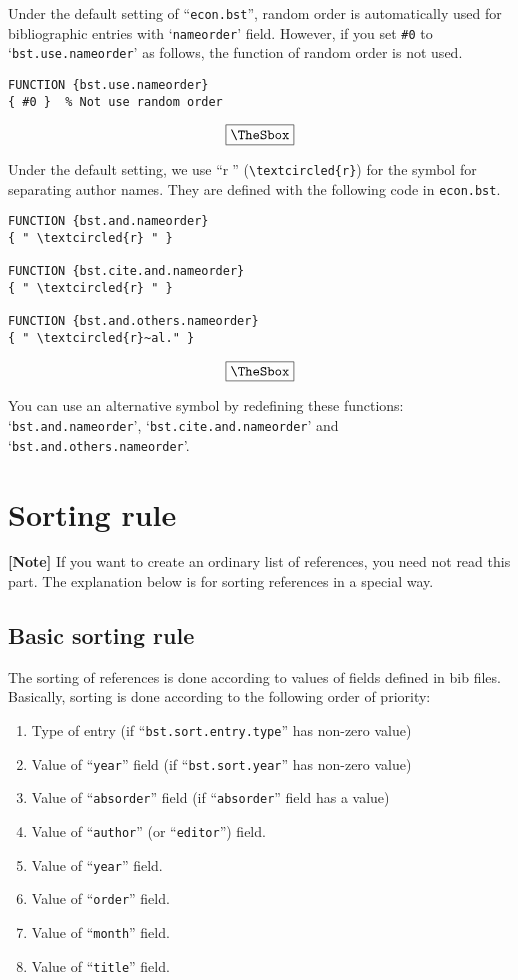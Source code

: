 \documentclass[10pt]{article}
\newenvironment{Frame}%
{\setlength{\fboxsep}{15pt}
\setlength{\mylength}{\linewidth}%
\addtolength{\mylength}{-2\fboxsep}%
\addtolength{\mylength}{-2\fboxrule}%
\Sbox
\minipage{\mylength}%
\setlength{\abovedisplayskip}{0pt}%
\setlength{\belowdisplayskip}{0pt}%
}%
{\endminipage\endSbox
\[\fbox{\TheSbox}\]}
\begin{document}
Under the default setting of ``\texttt{econ.bst}'', random order is
automatically used for bibliographic entries with `\texttt{nameorder}' field.
However, if you set \verb|#0| to `\texttt{bst.use.nameorder}' as follows, the
function of random order is not used.
\begin{Frame}
\begin{verbatim}
FUNCTION {bst.use.nameorder}
{ #0 }  % Not use random order
\end{verbatim}
\end{Frame}

Under the default setting, we use ``\textcircled{r}'' (\verb|\textcircled{r}|)
for the symbol for separating author names.
They are defined with the following code in \texttt{econ.bst}.
\begin{Frame}
\begin{verbatim}
FUNCTION {bst.and.nameorder}
{ " \textcircled{r} " }

FUNCTION {bst.cite.and.nameorder}
{ " \textcircled{r} " }

FUNCTION {bst.and.others.nameorder}
{ " \textcircled{r}~al." }
\end{verbatim}
\end{Frame}

You can use an alternative symbol by redefining these functions:
`\texttt{bst.and.nameorder}', `\texttt{bst.cite.and.nameorder}' and
`\texttt{bst.and.others.nameorder}'.


\section{Sorting rule}
\label{sec:sort_rule}

\noindent \textbf{[Note]} If you want to create an ordinary list of
references, you need not  read this part.  The explanation below is
for sorting references in a special way.

\subsection{Basic sorting rule}

The sorting of references is done according to values of fields defined
in bib files.  Basically, sorting is done according to the following
order of priority:
\begin{enumerate}
 \item Type of entry (if ``\texttt{bst.sort.entry.type}'' has non-zero value)
 \item Value of ``\texttt{year}'' field (if ``\texttt{bst.sort.year}'' has non-zero value)
 \item Value of ``\texttt{absorder}'' field (if ``\texttt{absorder}'' field has
       a value)
 \item Value of ``\texttt{author}'' (or ``\texttt{editor}'') field.
 \item Value of ``\texttt{year}'' field.
 \item Value of ``\texttt{order}'' field.
 \item Value of ``\texttt{month}'' field.
 \item Value of ``\texttt{title}'' field.
\end{enumerate}
\end{document}
